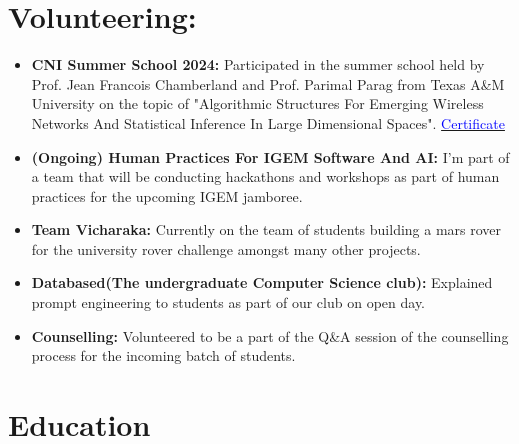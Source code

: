 \documentclass[11pt,a4paper,sans]{moderncv}
\begin{document}
\section{Volunteering:}
\begin{itemize}
  \item \textbf{CNI Summer School 2024:} Participated in the summer school held by Prof. Jean Francois Chamberland and Prof. Parimal Parag from Texas A\&M University on the topic of "Algorithmic Structures For Emerging Wireless Networks And Statistical Inference In Large Dimensional Spaces". \href{https://github.com/blackscreen-whitetext/Course-certs/blob/main/IISc/CNI_Summer_School.pdf}{\textcolor{blue}{Certificate}}
  \item \textbf{(Ongoing) Human Practices For IGEM Software And AI:} I'm part of a team that will be conducting hackathons and workshops as part of human practices for the upcoming IGEM jamboree.
  \item \textbf{Team Vicharaka:} Currently on the team of students building a mars rover for the university rover challenge amongst many other projects.
  \item \textbf{Databased(The undergraduate Computer Science club):} Explained prompt engineering to students as part of our club on open day. 
  \item \textbf{Counselling:} Volunteered to be a part of the Q\&A session of the counselling process for the incoming batch of students.
\end{itemize}
\section{Education}
\vspace{10pt}
\end{document}
